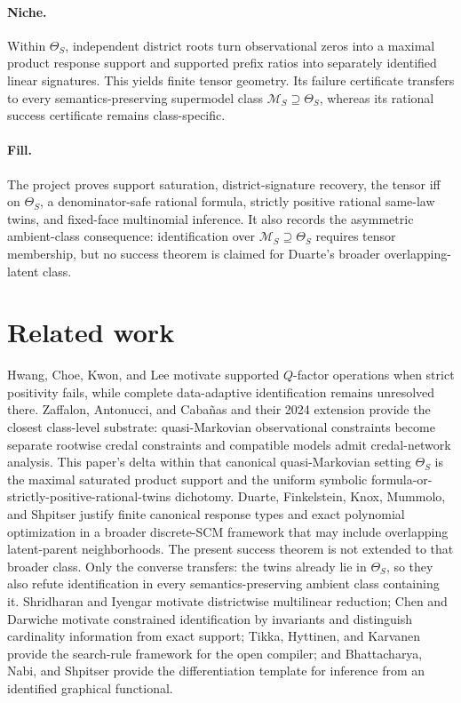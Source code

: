 \documentclass{article}
\begin{document}
\paragraph{Niche.} Within \(\Theta_S\), independent district roots turn observational zeros into a maximal product response support and supported prefix ratios into separately identified linear signatures. This yields finite tensor geometry. Its failure certificate transfers to every semantics-preserving supermodel class \(\mathcal M_S\supseteq\Theta_S\), whereas its rational success certificate remains class-specific.

\paragraph{Fill.} The project proves support saturation, district-signature recovery, the tensor iff on \(\Theta_S\), a denominator-safe rational formula, strictly positive rational same-law twins, and fixed-face multinomial inference. It also records the asymmetric ambient-class consequence: identification over \(\mathcal M_S\supseteq\Theta_S\) requires tensor membership, but no success theorem is claimed for Duarte's broader overlapping-latent class.

\section{Related work}

Hwang, Choe, Kwon, and Lee motivate supported \(Q\)-factor operations when strict positivity fails, while complete data-adaptive identification remains unresolved there. Zaffalon, Antonucci, and Cabañas and their 2024 extension provide the closest class-level substrate: quasi-Markovian observational constraints become separate rootwise credal constraints and compatible models admit credal-network analysis. This paper's delta within that canonical quasi-Markovian setting \(\Theta_S\) is the maximal saturated product support and the uniform symbolic formula-or-strictly-positive-rational-twins dichotomy. Duarte, Finkelstein, Knox, Mummolo, and Shpitser justify finite canonical response types and exact polynomial optimization in a broader discrete-SCM framework that may include overlapping latent-parent neighborhoods. The present success theorem is not extended to that broader class. Only the converse transfers: the twins already lie in \(\Theta_S\), so they also refute identification in every semantics-preserving ambient class containing it. Shridharan and Iyengar motivate districtwise multilinear reduction; Chen and Darwiche motivate constrained identification by invariants and distinguish cardinality information from exact support; Tikka, Hyttinen, and Karvanen provide the search-rule framework for the open compiler; and Bhattacharya, Nabi, and Shpitser provide the differentiation template for inference from an identified graphical functional.
\end{document}
